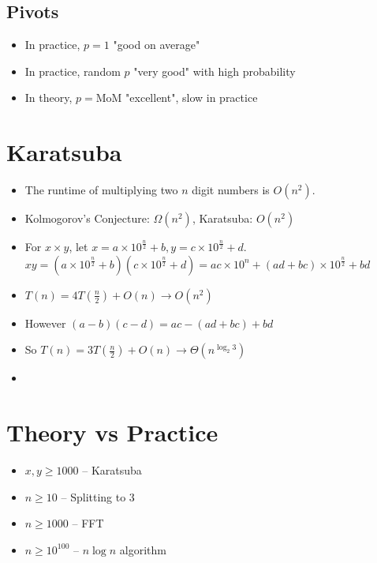 \subsection{Pivots}
\begin{itemize}
    \item In practice, $p = 1$ "good on average"
    \item In practice, random $p$ "very good" with high probability
    \item In theory, $p = \text{MoM}$ "excellent", slow in practice
\end{itemize}

\section{Karatsuba}
\begin{itemize}
    \item The runtime of multiplying two $n$ digit numbers is $O(n^2)$.
    \item Kolmogorov's Conjecture: $\Omega(n^2)$, Karatsuba: $O(n^2)$
    \item For $x \times y$, let $x = a \times 10^{\frac{n}{2}} + b, y = c \times 10^{\frac{n}{2}} + d$. \\
    $xy = (a \times 10^{\frac{n}{2}} + b)(c \times 10^{\frac{n}{2}} + d) = ac \times 10^n + (ad + bc) \times 10^{\frac{n}{2}} + bd$
    \item $T(n) = 4T(\frac{n}{2}) + O(n) \rightarrow O(n^2)$
    \item However $(a - b)(c - d) = ac - (ad + bc) + bd$
    \item So $T(n) = 3T(\frac{n}{2}) + O(n) \rightarrow \Theta(n^{\log_2 3})$
    \item[] 
\end{itemize}

\section{Theory vs Practice}
\begin{itemize}
    \item $x, y \geq 1000$ -- Karatsuba
    \item $n \geq 10$ -- Splitting to 3
    \item $n \geq 1000$ -- FFT
    \item $n \geq 10^{100}$ -- $n\log n$ algorithm
\end{itemize}
